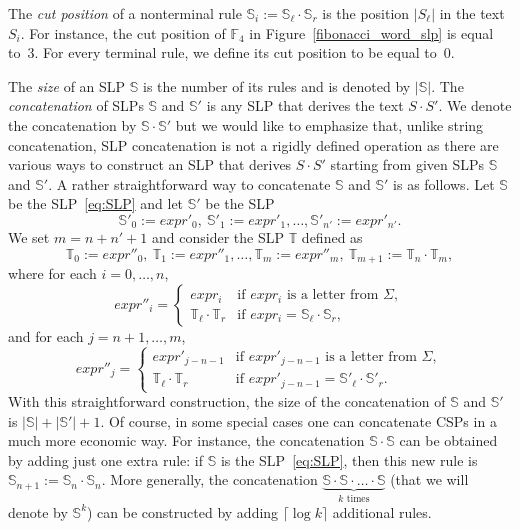 \documentclass[11pt]{article}
\theoremstyle{break}
\newcommand{\slp}[1]{\mathbb{#1}}
\begin{document}
The \emph{cut position} of a nonterminal rule $\slp{S}_i := \slp{S}_\ell\cdot \slp{S}_r$ is the position $|S_\ell|$ in the text $S_i$. For
instance, the cut position of $\slp{F}_4$ in Figure~\ref{fibonacci_word_slp} is equal to~3. For every terminal rule, we define its cut
position to be equal to~0.

The \emph{size} of an SLP $\slp{S}$ is the number of its rules and is denoted by $|\slp{S}|$. The \emph{concatenation} of SLPs $\slp{S}$
and $\slp{S}'$ is any SLP that derives the text $S\cdot S'$. We denote the concatenation by $\slp{S} \cdot \slp{S}'$ but we would like to
emphasize that, unlike string concatenation, SLP concatenation is not a rigidly defined operation as there are various ways to construct an
SLP that derives $S\cdot S'$ starting from given SLPs $\slp{S}$ and $\slp{S}'$. A rather straightforward way to concatenate $\slp{S}$ and
$\slp{S}'$ is as follows. Let $\slp{S}$ be the SLP~\eqref{eq:SLP} and let $\slp{S}'$ be the SLP
$$\slp{S}'_0 := expr'_0,\ \slp{S}'_1 := expr'_1, \dots, \slp{S}'_{n'} := expr'_{n'}.$$
We set $m=n+n'+1$ and consider the SLP $\slp{T}$ defined as
$$\slp{T}_0 := expr''_0,\ \slp{T}_1 := expr''_1, \dots, \slp{T}_{m} := expr''_{m},\ \slp{T}_{m+1}:=\slp{T}_n\cdot\slp{T}_m,$$
where for each $i=0,\dots,n$,
$$expr''_i=\begin{cases} expr_i &\text{if $expr_i$ is a letter from $\Sigma$},\\
\slp{T}_\ell\cdot \slp{T}_r &\text{if }  expr_i=\slp{S}_\ell\cdot \slp{S}_r,
\end{cases}$$
and for each $j=n+1,\dots,m$,
$$expr''_j=\begin{cases} expr'_{j-n-1} &\text{if $expr'_{j-n-1}$ is a letter from $\Sigma$},\\
\slp{T}_\ell\cdot \slp{T}_r &\text{if }  expr'_{j-n-1}=\slp{S}'_\ell\cdot \slp{S}'_r.
\end{cases}$$
With this straightforward construction, the size of the concatenation of $\slp{S}$ and $\slp{S}'$ is $|\slp{S}|+|\slp{S}'|+1$. Of course,
in some special cases one can concatenate CSPs in a much more economic way. For instance, the concatenation $\slp{S}\cdot\slp{S}$ can be
obtained by adding just one extra rule: if $\slp{S}$ is the SLP~\eqref{eq:SLP}, then this new rule is $\slp{S}_{n+1}:=\slp{S}_n\cdot
\slp{S}_n$. More generally, the concatenation $\underbrace{\slp{S}\cdot \slp{S}\cdot\ldots\cdot\slp{S}}_{k\text{ times}}$ (that we will
denote by $\slp{S}^k$) can be constructed by adding $\lceil\log k\rceil$ additional rules.
\end{document}
